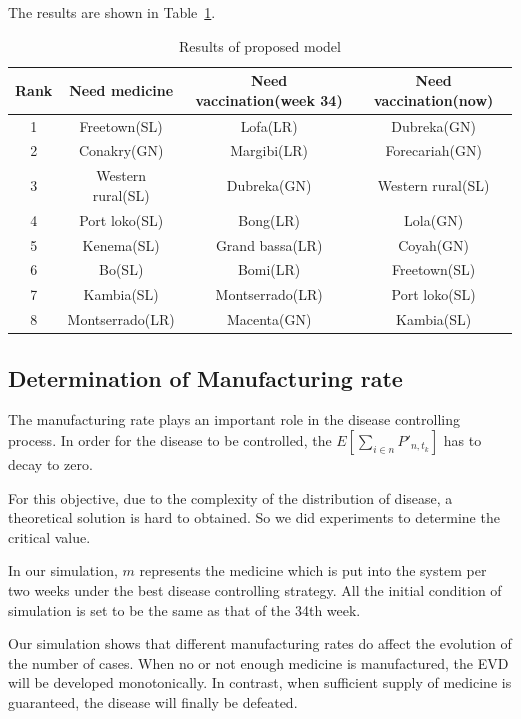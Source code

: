 \documentclass[11pt]{article}
\begin{document}
The results are shown in Table~\ref{testtable}.

\begin{table}[hbtp]
\begin{center}
\begin{tabular}{|c|c|c|c|}
\hline

Rank & Need medicine & Need vaccination(week 34) & Need vaccination(now) \\
\hline
1 &Freetown(SL) &Lofa(LR) &Dubreka(GN) \\
\hline
2 &Conakry(GN) &Margibi(LR) &Forecariah(GN) \\
\hline
3 &Western rural(SL) &Dubreka(GN) &Western rural(SL) \\
\hline
4 &Port loko(SL) &Bong(LR) &Lola(GN) \\
\hline
5 &Kenema(SL) &Grand bassa(LR) &Coyah(GN) \\
\hline
6 &Bo(SL) &Bomi(LR) &Freetown(SL) \\
\hline
7 &Kambia(SL) &Montserrado(LR) &Port loko(SL) \\
\hline
8 &Montserrado(LR) &Macenta(GN) &Kambia(SL) \\
\hline

\end{tabular}
\end{center}
\caption{Results of proposed model}
\label{testtable}
\end{table}





\subsection{Determination of Manufacturing rate }

The manufacturing rate plays an important role in the disease controlling process. In order for the disease to be controlled, the $E[\sum_{i \in n} {P'_{n,t_k}}]$
has to decay to zero.

For this objective, due to the complexity of the distribution of disease, a theoretical solution is hard to obtained. So we did experiments to determine the critical value.


In our simulation, $m$ represents the medicine which is put into the system per two weeks under the best disease controlling strategy. All the initial condition of simulation is set to be the same as that of the 34th week. 

Our simulation shows that different manufacturing rates do affect the evolution of the number of cases. When no or not enough medicine is manufactured, the EVD will be developed monotonically. In contrast, when sufficient supply of medicine is guaranteed, the disease will finally be defeated.
\end{document}
